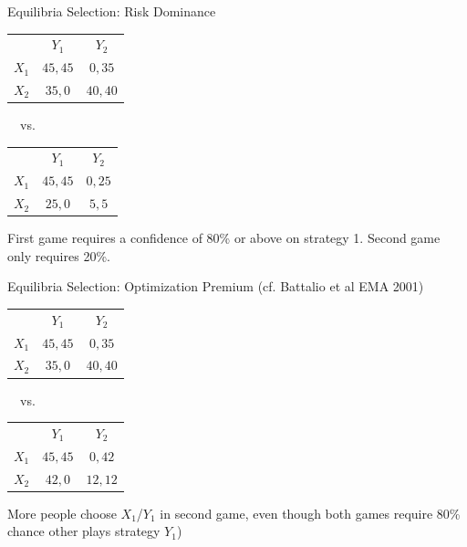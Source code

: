 \documentclass{beamer}
\begin{document}
\begin{frame}{Equilibria Selection: Risk Dominance }
\begin{card}
\begin{center}
\begin{tabular}{r|c|c|}
				\multicolumn{1}{r}{}& \multicolumn{1}{c}{$Y_1$}  & \multicolumn{1}{c}{$Y_2$} \\ \cline{2-3}
				$X_1$ &  $45,45$ & $0,35$ \\ \cline{2-3}
				$X_2$ &  $35,0$ & $40,40$ \\ \cline{2-3}
\end{tabular}
\ \ vs. \ 
\begin{tabular}{r|c|c|}
				\multicolumn{1}{r}{}& \multicolumn{1}{c}{$Y_1$}  & \multicolumn{1}{c}{$Y_2$} \\ \cline{2-3}
				$X_1$ &  $45,45$ & $0,25$ \\ \cline{2-3}
				$X_2$ &  $25,0$ & $5,5$ \\ \cline{2-3}
\end{tabular}
\end{center}
\end{card}

\begin{card}
First game requires a confidence of 80\% or above on strategy 1. Second game only requires 20\%.
\end{card}
\end{frame}

\begin{frame}{Equilibria Selection: Optimization Premium (cf. Battalio et al EMA 2001)}
\begin{card}
\begin{center}
\begin{tabular}{r|c|c|}
				\multicolumn{1}{r}{}& \multicolumn{1}{c}{$Y_1$}  & \multicolumn{1}{c}{$Y_2$} \\ \cline{2-3}
				$X_1$ &  $45,45$ & $0,35$ \\ \cline{2-3}
				$X_2$ &  $35,0$ & $40,40$ \\ \cline{2-3}
\end{tabular}
\ \ vs. \ 
\begin{tabular}{r|c|c|}
				\multicolumn{1}{r}{}& \multicolumn{1}{c}{$Y_1$}  & \multicolumn{1}{c}{$Y_2$} \\ \cline{2-3}
				$X_1$ &  $45,45$ & $0,42$ \\ \cline{2-3}
				$X_2$ &  $42,0$ & $12,12$ \\ \cline{2-3}
\end{tabular}
\end{center}
\end{card}

\pause 

\begin{card}
More people choose $X_1$/$Y_1$ in second game, even though both games require 80\% chance other plays strategy $Y_1$)
\end{card}
\end{frame}
\end{document}
